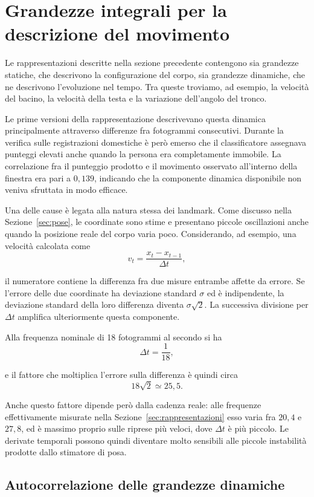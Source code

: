 \section{Grandezze integrali per la descrizione del movimento}
\label{sec:integrali}

Le rappresentazioni descritte nella sezione precedente contengono sia grandezze statiche, che descrivono la configurazione del corpo, sia grandezze dinamiche, che ne descrivono l'evoluzione nel tempo. Tra queste troviamo, ad esempio, la velocità del bacino, la velocità della testa e la variazione dell'angolo del tronco.

Le prime versioni della rappresentazione descrivevano questa dinamica principalmente attraverso differenze fra fotogrammi consecutivi. Durante la verifica sulle registrazioni domestiche è però emerso che il classificatore assegnava punteggi elevati anche quando la persona era completamente immobile. La correlazione fra il punteggio prodotto e il movimento osservato all'interno della finestra era pari a \(0{,}139\), indicando che la componente dinamica disponibile non veniva sfruttata in modo efficace.

Una delle cause è legata alla natura stessa dei landmark. Come discusso nella Sezione~\ref{sec:pose}, le coordinate sono stime e presentano piccole oscillazioni anche quando la posizione reale del corpo varia poco. Considerando, ad esempio, una velocità calcolata come
\[
v_t = \frac{x_t-x_{t-1}}{\Delta t},
\]

il numeratore contiene la differenza fra due misure entrambe affette da errore. Se l'errore delle due coordinate ha deviazione standard \(\sigma\) ed è indipendente, la deviazione standard della loro differenza diventa \(\sigma\sqrt{2}\). La successiva divisione per \(\Delta t\) amplifica ulteriormente questa componente.

Alla frequenza nominale di 18 fotogrammi al secondo si ha
\[
\Delta t = \frac{1}{18},
\]

e il fattore che moltiplica l'errore sulla differenza è quindi circa
\[
18\sqrt{2} \simeq 25{,}5.
\]

Anche questo fattore dipende però dalla cadenza reale: alle frequenze effettivamente misurate nella Sezione~\ref{sec:rappresentazioni} esso varia fra $20{,}4$ e $27{,}8$, ed è massimo proprio sulle riprese più veloci, dove $\Delta t$ è più piccolo. Le derivate temporali possono quindi diventare molto sensibili alle piccole instabilità prodotte dallo stimatore di posa.

\subsection{Autocorrelazione delle grandezze dinamiche}


